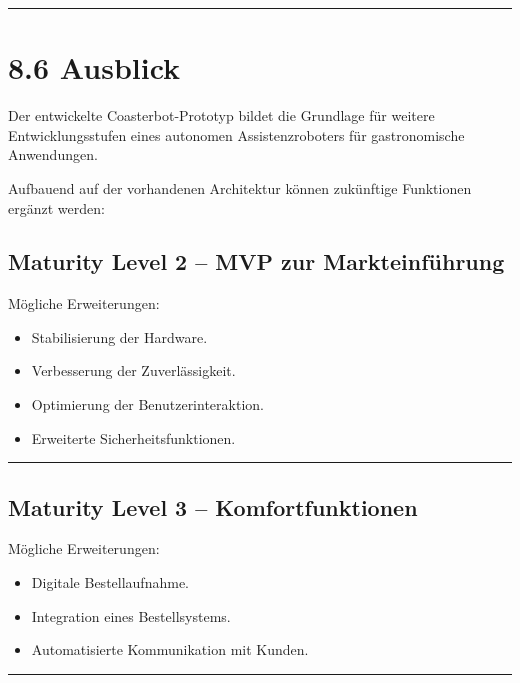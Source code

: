 \documentclass[
]{article}
\providecommand{\tightlist}{%
  \setlength{\itemsep}{0pt}\setlength{\parskip}{0pt}}
\begin{document}
\begin{center}\rule{0.5\linewidth}{0.5pt}\end{center}

\section{8.6 Ausblick}\label{ausblick}

Der entwickelte Coasterbot-Prototyp bildet die Grundlage für weitere
Entwicklungsstufen eines autonomen Assistenzroboters für gastronomische
Anwendungen.

Aufbauend auf der vorhandenen Architektur können zukünftige Funktionen
ergänzt werden:

\subsection{Maturity Level 2 -- MVP zur
Markteinführung}\label{maturity-level-2-mvp-zur-markteinfuxfchrung}

Mögliche Erweiterungen:

\begin{itemize}
\tightlist
\item
  Stabilisierung der Hardware.
\item
  Verbesserung der Zuverlässigkeit.
\item
  Optimierung der Benutzerinteraktion.
\item
  Erweiterte Sicherheitsfunktionen.
\end{itemize}

\begin{center}\rule{0.5\linewidth}{0.5pt}\end{center}

\subsection{Maturity Level 3 --
Komfortfunktionen}\label{maturity-level-3-komfortfunktionen}

Mögliche Erweiterungen:

\begin{itemize}
\tightlist
\item
  Digitale Bestellaufnahme.
\item
  Integration eines Bestellsystems.
\item
  Automatisierte Kommunikation mit Kunden.
\end{itemize}

\begin{center}\rule{0.5\linewidth}{0.5pt}\end{center}
\end{document}
